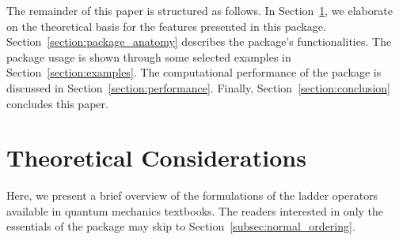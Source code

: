 \documentclass[onecolumn, 12pt, sort&compress]{elsarticle}
\begin{document}
The remainder of this paper is structured as follows. In Section~\ref{section:theoretical_considerations}, we elaborate on the theoretical basis for the features presented in this package. Section~\ref{section:package_anatomy} describes the package's functionalities. The package usage is shown through some selected examples in Section~\ref{section:examples}. The computational performance of the package is discussed in Section~\ref{section:performance}. Finally, Section~\ref{section:conclusion} concludes this paper.


\section{Theoretical Considerations}
\label{section:theoretical_considerations}

Here, we present a brief overview of the formulations of the ladder operators available in quantum mechanics textbooks. The readers interested in only the essentials of the package may skip to Section~\ref{subsec:normal_ordering}. 
\end{document}
